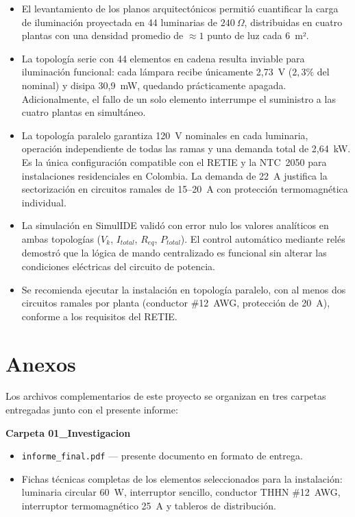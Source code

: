 \begin{itemize}
  \item El levantamiento de los planos arquitectónicos permitió cuantificar la carga de iluminación proyectada en 44 luminarias de $240~\Omega$, distribuidas en cuatro plantas con una densidad promedio de $\approx 1$ punto de luz cada 6~m².

  \item La topología serie con 44 elementos en cadena resulta inviable para iluminación funcional: cada lámpara recibe únicamente 2{,}73~V ($2{,}3\%$ del nominal) y disipa 30{,}9~mW, quedando prácticamente apagada. Adicionalmente, el fallo de un solo elemento interrumpe el suministro a las cuatro plantas en simultáneo.

  \item La topología paralelo garantiza 120~V nominales en cada luminaria, operación independiente de todas las ramas y una demanda total de 2{,}64~kW. Es la única configuración compatible con el RETIE y la NTC~2050 para instalaciones residenciales en Colombia. La demanda de 22~A justifica la sectorización en circuitos ramales de 15--20~A con protección termomagnética individual.

  \item La simulación en SimulIDE validó con error nulo los valores analíticos en ambas topologías ($V_k$, $I_{total}$, $R_{eq}$, $P_{total}$). El control automático mediante relés demostró que la lógica de mando centralizado es funcional sin alterar las condiciones eléctricas del circuito de potencia.

  \item Se recomienda ejecutar la instalación en topología paralelo, con al menos dos circuitos ramales por planta (conductor \#12~AWG, protección de 20~A), conforme a los requisitos del RETIE.
\end{itemize}

\section*{Anexos}

Los archivos complementarios de este proyecto se organizan en tres carpetas entregadas junto con el presente informe:

\medskip
\noindent\textbf{Carpeta 01\_Investigacion}
\begin{itemize}
  \item \texttt{informe\_final.pdf} — presente documento en formato de entrega.
  \item Fichas técnicas completas de los elementos seleccionados para la instalación: luminaria circular 60~W, interruptor sencillo, conductor THHN \#12~AWG, interruptor termomagnético 25~A y tableros de distribución.
\end{itemize}

